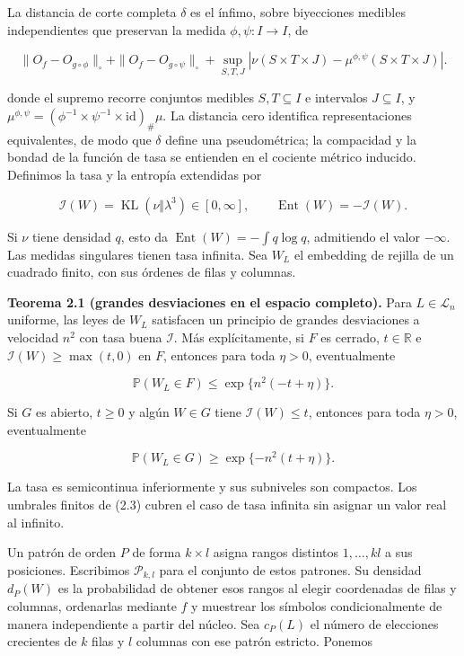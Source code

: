 \documentclass[spanish,11pt,a4paper]{article}
\begin{document}
La distancia de corte completa \(\delta\) es el ínfimo, sobre biyecciones medibles independientes que preservan la medida \(\phi,\psi:I\to I\), de

\nopagebreak[4]
\[\|O_f-O_{g\circ\phi}\|_\square+
\|O_f-O_{g\circ\psi}\|_\square+
\sup_{S,T,J}|\nu(S\times T\times J)-\mu^{\phi,\psi}(S\times T\times J)|.\tag{2.1}\]

donde el supremo recorre conjuntos medibles \(S,T\subseteq I\) e intervalos \(J\subseteq I\), y \(\mu^{\phi,\psi}=(\phi^{-1}\times\psi^{-1}\times\mathrm{id})_\#\mu\). La distancia cero identifica representaciones equivalentes, de modo que \(\delta\) define una pseudométrica; la compacidad y la bondad de la función de tasa se entienden en el cociente métrico inducido. Definimos la tasa y la entropía extendidas por

\nopagebreak[4]
\[\mathcal I(W)=\operatorname{KL}(\nu\Vert\lambda^3)\in[0,\infty],
\qquad \operatorname{Ent}(W)=-\mathcal I(W).\tag{2.2}\]

Si \(\nu\) tiene densidad \(q\), esto da \(\operatorname{Ent}(W)=-\int q\log q\), admitiendo el valor \(-\infty\). Las medidas singulares tienen tasa infinita. Sea \(W_L\) el embedding de rejilla de un cuadrado finito, con sus órdenes de filas y columnas.

\textbf{Teorema 2.1 (grandes desviaciones en el espacio completo).} Para \(L\in\mathcal L_n\) uniforme, las leyes de \(W_L\) satisfacen un principio de grandes desviaciones a velocidad \(n^2\) con tasa buena \(\mathcal I\). Más explícitamente, si \(F\) es cerrado, \(t\in\mathbb R\) e \(\mathcal I(W)\ge\max(t,0)\) en \(F\), entonces para toda \(\eta>0\), eventualmente

\nopagebreak[4]
\[\mathbb P(W_L\in F)\le\exp\{n^2(-t+\eta)\}.\tag{2.3}\]

Si \(G\) es abierto, \(t\ge0\) y algún \(W\in G\) tiene \(\mathcal I(W)\le t\), entonces para toda \(\eta>0\), eventualmente

\nopagebreak[4]
\[\mathbb P(W_L\in G)\ge\exp\{-n^2(t+\eta)\}.\tag{2.4}\]

La tasa es semicontinua inferiormente y sus subniveles son compactos. Los umbrales finitos de (2.3) cubren el caso de tasa infinita sin asignar un valor real al infinito.

Un patrón de orden \(P\) de forma \(k\times l\) asigna rangos distintos \(1,\ldots,kl\) a sus posiciones. Escribimos \(\mathcal P_{k,l}\) para el conjunto de estos patrones. Su densidad \(d_P(W)\) es la probabilidad de obtener esos rangos al elegir coordenadas de filas y columnas, ordenarlas mediante \(f\) y muestrear los símbolos condicionalmente de manera independiente a partir del núcleo. Sea \(c_P(L)\) el número de elecciones crecientes de \(k\) filas y \(l\) columnas con ese patrón estricto. Ponemos
\end{document}
